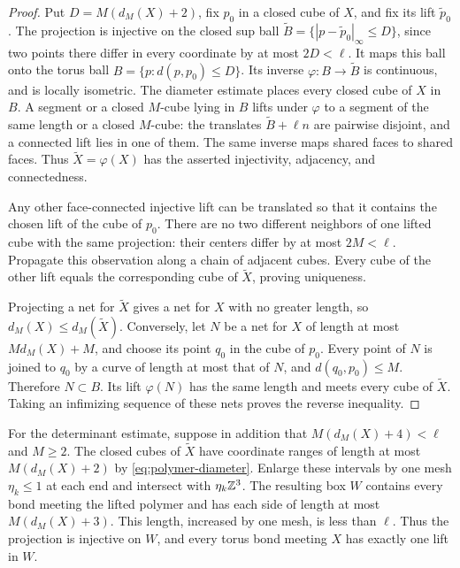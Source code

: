 \begin{proof}
Put $D=M(d_M(X)+2)$, fix $p_0$ in a closed cube of $X$, and fix its
lift $\widetilde p_0$. The projection is injective on the closed sup
ball $\widetilde B=\{|p-\widetilde p_0|_\infty\le D\}$, since two
points there differ in every coordinate by at most $2D<\ell$.
It maps this ball onto the torus ball $B=\{p:d(p,p_0)\le D\}$.
Its inverse $\varphi:B\to\widetilde B$ is continuous, and is locally
isometric. The diameter estimate places every closed cube of $X$ in
$B$. A segment or a closed $M$-cube lying in $B$ lifts under
$\varphi$ to a segment of the same length or a closed $M$-cube:
the translates $\widetilde B+\ell n$ are pairwise disjoint, and a
connected lift lies in one of them. The same inverse maps shared
faces to shared faces. Thus $\widetilde X=\varphi(X)$ has the
asserted injectivity, adjacency, and connectedness.

Any other face-connected injective lift can be translated so that it
contains the chosen lift of the cube of $p_0$. There are no two
different neighbors of one lifted cube with the same projection:
their centers differ by at most $2M<\ell$. Propagate this observation
along a chain of adjacent cubes. Every cube of the other lift equals
the corresponding cube of $\widetilde X$, proving uniqueness.

Projecting a net for $\widetilde X$ gives a net for $X$ with no greater
length, so $d_M(X)\le d_M(\widetilde X)$. Conversely, let $N$ be a
net for $X$ of length at most $Md_M(X)+M$, and choose its point $q_0$
in the cube of $p_0$. Every point of $N$ is joined to $q_0$ by a
curve of length at most that of $N$, and $d(q_0,p_0)\le M$.
Therefore $N\subset B$. Its lift $\varphi(N)$ has the same length
and meets every cube of $\widetilde X$. Taking an infimizing sequence
of these nets proves the reverse inequality.
\end{proof}

For the determinant estimate, suppose in addition that
$M(d_M(X)+4)<\ell$ and $M\ge2$. The closed cubes of $\widetilde X$
have coordinate ranges of length at most $M(d_M(X)+2)$ by
\eqref{eq:polymer-diameter}. Enlarge these intervals by one mesh
$\eta_k\le1$ at each end and intersect with $\eta_k\mathbb Z^3$. The
resulting box $W$ contains every bond meeting the lifted polymer and
has each side of length at most $M(d_M(X)+3)$. This length, increased
by one mesh, is less than $\ell$. Thus the projection is injective
on $W$, and every torus bond meeting $X$ has exactly one lift in $W$.

\printbibliography

